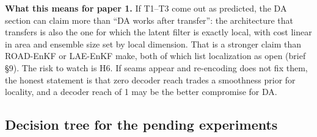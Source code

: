 \documentclass[11pt]{article}
\begin{document}
\textbf{What this means for paper 1.} If T1--T3 come out as predicted,
the DA section can claim more than ``DA works after transfer'': the
architecture that transfers is also the one for which the latent filter
is exactly local, with cost linear in area and ensemble size set by local
dimension. That is a stronger claim than ROAD-EnKF or LAE-EnKF make,
both of which list localization as open (brief \S9). The risk to watch
is H6. If seams appear and re-encoding does not fix them, the honest
statement is that zero decoder reach trades a smoothness prior for
locality, and a decoder reach of 1 may be the better compromise for DA.

\subsection{Decision tree for the pending experiments}
\end{document}
